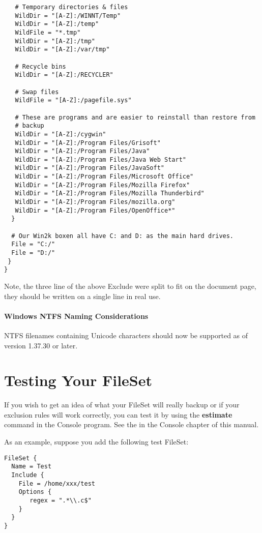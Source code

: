 \begin{verbatim}
   # Temporary directories & files
   WildDir = "[A-Z]:/WINNT/Temp"
   WildDir = "[A-Z]:/temp"
   WildFile = "*.tmp"
   WildDir = "[A-Z]:/tmp"
   WildDir = "[A-Z]:/var/tmp"

   # Recycle bins
   WildDir = "[A-Z]:/RECYCLER"

   # Swap files
   WildFile = "[A-Z]:/pagefile.sys"

   # These are programs and are easier to reinstall than restore from
   # backup
   WildDir = "[A-Z]:/cygwin"
   WildDir = "[A-Z]:/Program Files/Grisoft"
   WildDir = "[A-Z]:/Program Files/Java"
   WildDir = "[A-Z]:/Program Files/Java Web Start"
   WildDir = "[A-Z]:/Program Files/JavaSoft"
   WildDir = "[A-Z]:/Program Files/Microsoft Office"
   WildDir = "[A-Z]:/Program Files/Mozilla Firefox"
   WildDir = "[A-Z]:/Program Files/Mozilla Thunderbird"
   WildDir = "[A-Z]:/Program Files/mozilla.org"
   WildDir = "[A-Z]:/Program Files/OpenOffice*"
  }

  # Our Win2k boxen all have C: and D: as the main hard drives.
  File = "C:/"
  File = "D:/"
 }
}
\end{verbatim}
\normalsize

Note, the three line of the above Exclude were split to fit on the document
page, they should be written on a single line in real use. 

\paragraph*{Windows NTFS Naming Considerations}

NTFS filenames containing Unicode characters should now be supported
as of version 1.37.30 or later.

\section{Testing Your FileSet}

If you wish to get an idea of what your FileSet will really backup or if your
exclusion rules will work correctly, you can test it by using the {\bf
estimate} command in the Console program. See the 
 in the Console chapter of this
manual.

As an example, suppose you add the following test FileSet:

\footnotesize
\begin{verbatim}
FileSet {
  Name = Test
  Include {
    File = /home/xxx/test
    Options {
       regex = ".*\\.c$"
    }
  }
}
\end{verbatim}
\normalsize

